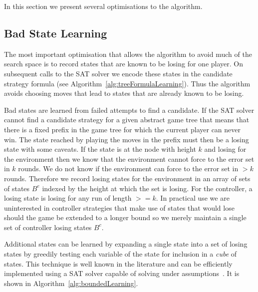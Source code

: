 In this section we present several optimisations to the algorithm.

\subsection{Bad State Learning}

The most important optimisation that allows the algorithm to avoid much of the search space is to record states that are known to be losing for one player. On subsequent calls to the SAT solver we encode these states in the candidate strategy formula (see Algorithm~\ref{alg:treeFormulaLearning}). Thus the algorithm avoids choosing moves that lead to states that are already known to be losing.

Bad states are learned from failed attempts to find a candidate. If the SAT solver cannot find a candidate strategy for a given abstract game tree that means that there is a fixed prefix in the game tree for which the current player can never win. The state reached by playing the moves in the prefix must then be a losing state with some caveats. If the state is at the node with height $k$ and losing for the environment then we know that the environment cannot force to the error set in $k$ rounds. We do not know if the environment can force to the error set in $> k$ rounds. Therefore we record losing states for the environment in an array of sets of states $B^e$ indexed by the height at which the set is losing. For the controller, a losing state is losing for any run of length $>= k$. In practical use we are uninterested in controller strategies that make use of states that would lose should the game be extended to a longer bound so we merely maintain a single set of controller losing states $B^c$.

Additional states can be learned by expanding a single state into a set of losing states by greedily testing each variable of the state for inclusion in a \emph{cube} of states. This technique is well known in the literature and can be efficiently implemented using a SAT solver capable of solving under assumptions~\cite{Een03}. It is shown in Algorithm~\ref{alg:boundedLearning}.

